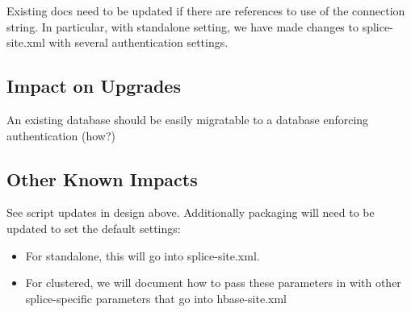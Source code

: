Existing docs need to be updated if there are references to use of the connection string. In particular, with standalone setting, we have made changes 
to splice-site.xml with several authentication settings. 

\subsection{Impact on Upgrades}

An existing database should be easily migratable to a database enforcing authentication (how?)

\subsection{Other Known Impacts}

See script updates in design above.  Additionally packaging will need to be updated to set the default settings:
\begin{itemize}
\item For standalone, this will go into splice-site.xml.
\item For clustered, we will document how to pass these parameters in with other splice-specific parameters that go into hbase-site.xml
\end{itemize}
 

%

